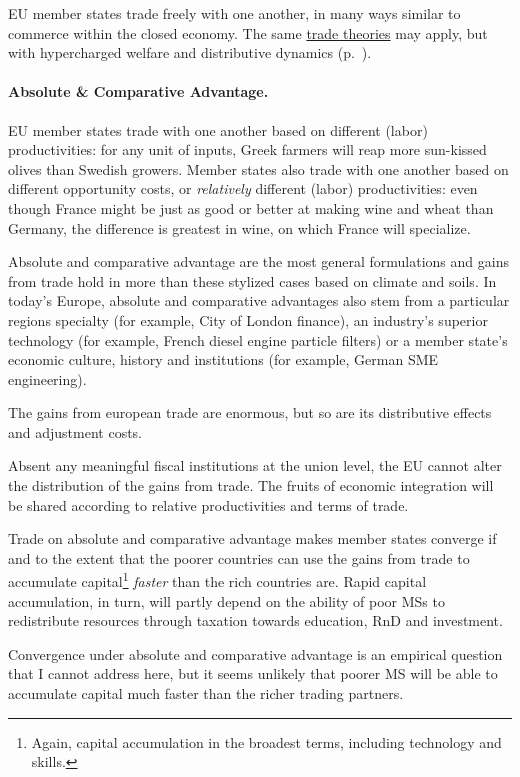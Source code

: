 \gls{EU} member states trade freely with one another, in many ways similar to commerce within the closed economy. The same \hyperref[sec:space]{trade theories} may apply, but with hypercharged welfare and distributive dynamics (p.~\pageref{sec:space}). 
		
\paragraph{Absolute \& Comparative Advantage.} \gls{EU} member states trade with one another based on different (labor) productivities: for any unit of inputs, Greek farmers will reap more sun-kissed olives than Swedish growers. Member states also trade with one another based on different opportunity costs, or \emph{relatively} different (labor) productivities: even though France might be just as good or better at making wine and wheat than Germany, the difference is greatest in wine, on which France will specialize. 

Absolute and comparative advantage are the most general formulations and gains from trade hold in more than these stylized cases based on climate and soils. In today's Europe, absolute and comparative advantages also stem from a particular regions specialty (for example, City of London finance), an industry's superior technology (for example, French diesel engine particle filters) or a member state's economic culture, history and institutions (for example, German \gls{SME} engineering).

The gains from european trade are enormous, but so are its distributive effects and adjustment costs. 

Absent any meaningful fiscal institutions at the union level, the \gls{EU} cannot alter the distribution of the gains from trade. The fruits of economic integration will be shared according to relative productivities and terms of trade.

Trade on absolute and comparative advantage makes member states converge if and to the extent that the poorer countries can use the gains from trade to accumulate capital\footnote{
	Again, capital accumulation in the broadest terms, including technology and skills.}
\emph{faster} than the rich countries are. Rapid capital accumulation, in turn, will partly depend on the ability of poor \glspl{MS} to redistribute resources through taxation towards education, \gls{RnD} and investment.

Convergence under absolute and comparative advantage is an empirical question that I cannot address here, but it seems unlikely that poorer \gls{MS} will be able to accumulate capital much faster than the richer trading partners. 

